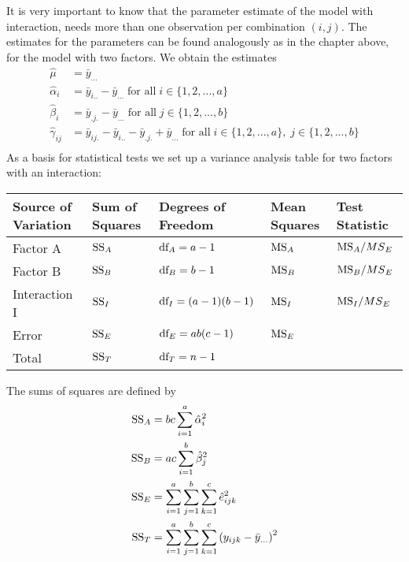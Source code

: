It is very important to know that the parameter estimate of the model with interaction, needs more than one observation per combination $(i, j)$. The estimates for the parameters can be found analogously as in the chapter above, for the model with two factors. We obtain the estimates
\begin{equation}
  \begin{split}
    \hat{\mu}         &= \bar{y}_{...}\\
    \hat{\alpha}_i    &= \bar{y}_{i..} - \bar{y}_{...} \;\text{for all}\; i \in \{1, 2, ..., a\}\\
    \hat{\beta}_i     &= \bar{y}_{.j.} - \bar{y}_{...}  \;\text{for all}\; j \in \{1, 2, ..., b\}\\
    \hat{\gamma}_{ij} &= \bar{y}_{ij.} - \bar{y}_{i..} - \bar{y}_{.j.} + \bar{y}_{...}  \;\text{for all}\; i \in \{1, 2, ..., a\},\;j \in \{1, 2, ..., b\}\\
  \end{split}
\end{equation}
As a basis for statistical tests we set up a variance analysis table for two factors with an interaction:
\begin{table}[H]
  \footnotesize
  \centering
  \begin{tabular}{ m{1.6cm} | m{0.9cm} l m{0.8cm} m{1.2cm}}
      Source of Variation  & Sum of Squares &  Degrees of Freedom & Mean Squares & Test Statistic \\ \hline
      Factor A      & $\textup{SS}_A$ & $\textup{df}_A = a-1$        & $\textup{MS}_A$ & $\textup{MS}_A / {MS}_E$\\
      Factor B      & $\textup{SS}_B$ & $\textup{df}_B = b-1$        & $\textup{MS}_B$ & $\textup{MS}_B / {MS}_E$\\
      Interaction I & $\textup{SS}_I$ & $\textup{df}_I = (a-1)(b-1)$ & $\textup{MS}_I$ & $\textup{MS}_I / {MS}_E$\\
      Error         & $\textup{SS}_E$ & $\textup{df}_E = ab(c-1)$    & $\textup{MS}_E$ & \\ \hline
      Total         & $\textup{SS}_T$ & $\textup{df}_T = n-1$        &                 &\\
  \end{tabular}
\end{table}
The sums of squares are defined by
\begin{equation}
  \begin{split}
    \textup{SS}_A &= bc \sum_{i=1}^a \hat{\alpha}_i^2\\
    \textup{SS}_B &= ac \sum_{i=1}^b \hat{\beta}_j^2\\
    \textup{SS}_E &= \sum_{i=1}^a \sum_{j=1}^b \sum_{k=1}^c \hat{e}_{ijk}^2\\
    \textup{SS}_T &= \sum_{i=1}^a \sum_{j=1}^b \sum_{k=1}^c \left(y_{ijk} - \bar{y}_{...}\right)^2
  \end{split}
\end{equation}
